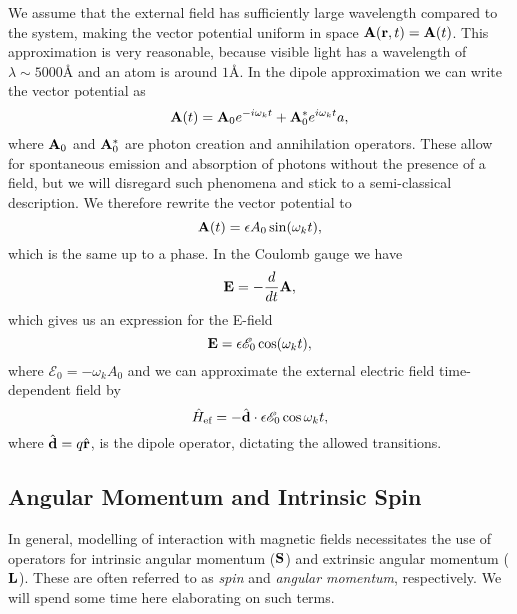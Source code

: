    We assume that the external field has sufficiently large wavelength compared to the 
    system, making the vector potential uniform in space $\vb{A}(\vb{r}, t) = \vb{A}(t)$.
    This approximation is very reasonable, because visible light has a wavelength of 
    $\lambda \sim 5000 \text{Å}$ and an atom is around $1 \text{Å}$. In the dipole 
    approximation we can write the vector potential as 
    \begin{equation}
        \vb{A}(t) = \vb{A}_0e^{-i \omega_k t} + \vb{A}_0^*e^{i\omega_k t}a,
    \end{equation}
    where $\vb{A}_0$ and $\vb{A}_0^*$ are photon creation and annihilation operators. 
    These allow for spontaneous emission and absorption of photons without the presence 
    of a field, but we will disregard such phenomena and stick to a semi-classical 
    description. We therefore rewrite the vector potential to 
    \begin{equation}
        \vb{A}(t) = \epsilon A_0\sin(\omega_k t),
    \end{equation}
    which is the same up to a phase. In the Coulomb gauge we have 
    \begin{equation}
        \vb{E} = - \frac{d}{dt}\vb{A},
    \end{equation}
    which gives us an expression for the E-field 
    \begin{equation}
        \vb{E} = \epsilon \mathscr{E}_0 \cos(\omega_k t),
    \end{equation}
    where $\mathscr{E}_0 = -\omega_k A_0$ and we can approximate the external electric 
    field time-dependent field by 
    \begin{equation}
        \hat{H}_\text{ef} = - \hat{\vb{d}} \cdot \epsilon \mathscr{E}_0 \cos{\omega_k t},
    \end{equation}
    where $\hat{\vb{d}} = q\hat{\vb{r}}$, is the dipole operator, dictating the 
    allowed transitions.

    \subsection{Angular Momentum and Intrinsic Spin}

    In general, modelling of interaction with magnetic fields necessitates the 
    use of operators for intrinsic angular momentum ($\vb{S}$) and extrinsic 
    angular momentum ($\vb{L}$). These are often referred to as \emph{spin} 
    and \emph{angular momentum}, respectively.
    We will spend some time here elaborating on such terms.

